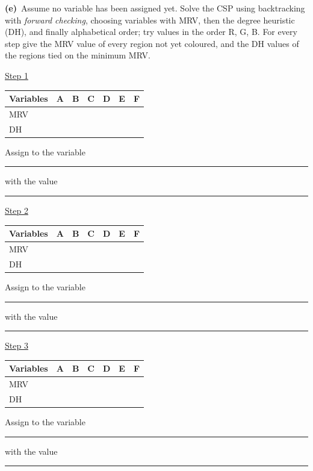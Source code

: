 \documentclass[11pt,a4paper]{article}
\newcommand{\subq}[1]{\par\smallskip\noindent\textbf{#1}\ }
\begin{document}
\subq{(e)}Assume no variable has been assigned yet. Solve the CSP using backtracking with \emph{forward checking}, choosing variables with MRV, then the degree heuristic (DH), and finally alphabetical order; try values in the order R, G, B. For every step give the MRV value of every region not yet coloured, and the DH values of the regions tied on the minimum MRV.
\par \underline{Step 1}\par\begin{center}\small \begin{tabular}{|l|c|c|c|c|c|c|}\hline Variables & \textbf{A} & \textbf{B} & \textbf{C} & \textbf{D} & \textbf{E} & \textbf{F}\\ \hline MRV & \phantom{0} & \phantom{0} & \phantom{0} & \phantom{0} & \phantom{0} & \phantom{0}\\[1mm]\hline DH & \phantom{0} & \phantom{0} & \phantom{0} & \phantom{0} & \phantom{0} & \phantom{0}\\[1mm]\hline\end{tabular}\end{center}Assign to the variable \rule{2.5cm}{0.3pt} with the value \rule{2.5cm}{0.3pt}\par
\underline{Step 2}\par\begin{center}\small \begin{tabular}{|l|c|c|c|c|c|c|}\hline Variables & \textbf{A} & \textbf{B} & \textbf{C} & \textbf{D} & \textbf{E} & \textbf{F}\\ \hline MRV & \phantom{0} & \phantom{0} & \phantom{0} & \phantom{0} & \phantom{0} & \phantom{0}\\[1mm]\hline DH & \phantom{0} & \phantom{0} & \phantom{0} & \phantom{0} & \phantom{0} & \phantom{0}\\[1mm]\hline\end{tabular}\end{center}Assign to the variable \rule{2.5cm}{0.3pt} with the value \rule{2.5cm}{0.3pt}\par
\underline{Step 3}\par\begin{center}\small \begin{tabular}{|l|c|c|c|c|c|c|}\hline Variables & \textbf{A} & \textbf{B} & \textbf{C} & \textbf{D} & \textbf{E} & \textbf{F}\\ \hline MRV & \phantom{0} & \phantom{0} & \phantom{0} & \phantom{0} & \phantom{0} & \phantom{0}\\[1mm]\hline DH & \phantom{0} & \phantom{0} & \phantom{0} & \phantom{0} & \phantom{0} & \phantom{0}\\[1mm]\hline\end{tabular}\end{center}Assign to the variable \rule{2.5cm}{0.3pt} with the value \rule{2.5cm}{0.3pt}\par
\end{document}
